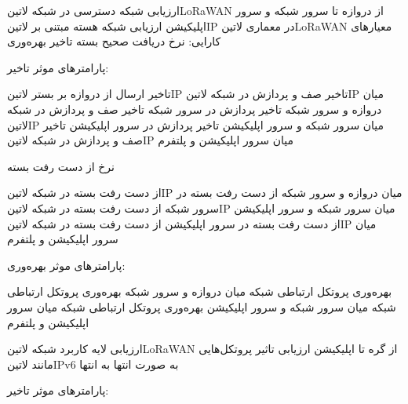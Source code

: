 \documentclass[dvipsnames]{beamer}
\begin{document}
\begin{persian}

	\begin{frame}{ارزیابی شبکه دسترسی در شبکه ‌لاتین{LoRaWAN} از دروازه تا سرور شبکه و سرور اپلیکیشن}
		 ارزیابی شبکه هسته مبتنی بر ‌لاتین{IP} در معماری ‌لاتین{LoRaWAN}
		 معیارهای کارایی:
		 نرخ دریافت صحیح بسته
		 تاخیر
		 بهره‌وری
	\end{frame}

	\begin{frame}{پارامترهای موثر}
		 تاخیر:

		 تاخیر ارسال از دروازه بر بستر ‌لاتین{IP}
		 تاخیر صف و پردازش در شبکه ‌لاتین{IP} میان دروازه و سرور شبکه
		 تاخیر پردازش در سرور شبکه
		 تاخیر صف و پردازش در شبکه ‌لاتین{IP} میان سرور شبکه و سرور اپلیکیشن
		 تاخیر پردازش در سرور اپلیکیشن
		 تاخیر صف و پردازش در شبکه ‌لاتین{IP} میان سرور اپلیکیشن و پلتفرم

		نرخ از دست رفت بسته

		 از دست رفت بسته در شبکه ‌لاتین{IP} میان دروازه و سرور شبکه
		 از دست رفت بسته در سرور شبکه
		 از دست رفت بسته در شبکه ‌لاتین{IP} میان سرور شبکه و سرور اپلیکیشن
		 از دست رفت بسته در سرور اپلیکیشن
		 از دست رفت بسته در شبکه ‌لاتین{IP} میان سرور اپلیکیشن و پلتفرم

	\end{frame}

	\begin{frame}{پارامترهای موثر}
		 بهره‌وری:

		 بهره‌وری پروتکل ارتباطی شبکه میان دروازه و سرور شبکه
		 بهره‌وری پروتکل ارتباطی شبکه میان سرور شبکه و سرور اپلیکیشن
		 بهره‌وری پروتکل ارتباطی شبکه میان سرور اپلیکیشن و پلتفرم

	\end{frame}

	\begin{frame}{ارزیابی لایه کاربرد شبکه ‌لاتین{LoRaWAN} از گره تا اپلیکیشن}
		 ارزیابی تاثیر پروتکل‌هایی مانند ‌لاتین{IPv6} به صورت انتها به انتها
	\end{frame}

	\begin{frame}{پارامترهای موثر}
		 تاخیر:


\end{frame}
\end{persian}
\end{document}
